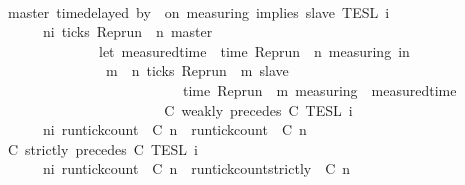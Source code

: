 \begin{isabellebody}
\ \ \ \ \ \ \ \ \ \ \ \ \ \ \ {\isacharparenright}\isanewline
\ \ \ \ \ \ {\isacharbraceright}{\isacartoucheclose}\isanewline
{\isacharbar}\ {\isacartoucheopen}{\isasymlbrakk}\ master\ time{\isacharminus}delayed{\isasymbowtie}\ by\ {\isasymdelta}{\isasymtau}\ on\ measuring\ implies\ slave\ {\isasymrbrakk}\isactrlsub T\isactrlsub E\isactrlsub S\isactrlsub L\isactrlbsup {\isasymge}\ i\isactrlesup \ {\isacharequal}\isanewline
\ \ \ \ \ \ {\isacharbraceleft}{\isasymrho}{\isachardot}\ {\isasymforall}n{\isasymge}i{\isachardot}\ ticks\ {\isacharparenleft}{\isacharparenleft}Rep{\isacharunderscore}run\ {\isasymrho}{\isacharparenright}\ n\ master{\isacharparenright}\ {\isasymlongrightarrow}\isanewline
\ \ \ \ \ \ \ \ \ \ \ \ \ \ \ {\isacharparenleft}let\ measured{\isacharunderscore}time\ {\isacharequal}\ time\ {\isacharparenleft}{\isacharparenleft}Rep{\isacharunderscore}run\ {\isasymrho}{\isacharparenright}\ n\ measuring{\isacharparenright}\ in\isanewline
\ \ \ \ \ \ \ \ \ \ \ \ \ \ \ \ {\isasymexists}m\ {\isasymge}\ n{\isachardot}\ ticks\ {\isacharparenleft}{\isacharparenleft}Rep{\isacharunderscore}run\ {\isasymrho}{\isacharparenright}\ m\ slave{\isacharparenright}\isanewline
\ \ \ \ \ \ \ \ \ \ \ \ \ \ \ \ \ \ \ \ \ \ \ \ \ \ {\isasymand}\ time\ {\isacharparenleft}{\isacharparenleft}Rep{\isacharunderscore}run\ {\isasymrho}{\isacharparenright}\ m\ measuring{\isacharparenright}\ {\isacharequal}\ measured{\isacharunderscore}time\ {\isacharplus}\ {\isasymdelta}{\isasymtau}\isanewline
\ \ \ \ \ \ \ \ \ \ \ \ \ \ \ {\isacharparenright}\isanewline
\ \ \ \ \ \ {\isacharbraceright}{\isacartoucheclose}\isanewline
{\isacharbar}\ {\isacartoucheopen}{\isasymlbrakk}\ C\ weakly\ precedes\ C\ {\isasymrbrakk}\isactrlsub T\isactrlsub E\isactrlsub S\isactrlsub L\isactrlbsup {\isasymge}\ i\isactrlesup \ {\isacharequal}\isanewline
\ \ \ \ \ \ {\isacharbraceleft}{\isasymrho}{\isachardot}\ {\isasymforall}n{\isasymge}i{\isachardot}\ {\isacharparenleft}run{\isacharunderscore}tick{\isacharunderscore}count\ {\isasymrho}\ C\ n{\isacharparenright}\ {\isasymle}\ {\isacharparenleft}run{\isacharunderscore}tick{\isacharunderscore}count\ {\isasymrho}\ C\ n{\isacharparenright}{\isacharbraceright}{\isacartoucheclose}\isanewline
{\isacharbar}\ {\isacartoucheopen}{\isasymlbrakk}\ C\ strictly\ precedes\ C\ {\isasymrbrakk}\isactrlsub T\isactrlsub E\isactrlsub S\isactrlsub L\isactrlbsup {\isasymge}\ i\isactrlesup \ {\isacharequal}\isanewline
\ \ \ \ \ \ {\isacharbraceleft}{\isasymrho}{\isachardot}\ {\isasymforall}n{\isasymge}i{\isachardot}\ {\isacharparenleft}run{\isacharunderscore}tick{\isacharunderscore}count\ {\isasymrho}\ C\ n{\isacharparenright}\ {\isasymle}\ {\isacharparenleft}run{\isacharunderscore}tick{\isacharunderscore}count{\isacharunderscore}strictly\ {\isasymrho}\ C\ n{\isacharparenright}{\isacharbraceright}{\isacartoucheclose}\isanewline

\end{isabellebody}
